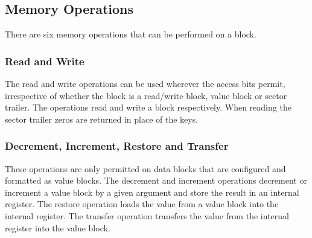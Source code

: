 \documentclass[final,dissertation.tex]{subfiles}
\begin{document}
  \subsection{Memory Operations}

  There are six memory operations that can be performed on a block.

  \subsubsection{Read and Write}
  The read and write operations can be used wherever the access bits permit, irrespective of whether the block is a read/write block, value block or sector trailer. The operations read and write a block respectively. When reading the sector trailer zeros are returned in place of the keys.

  \subsubsection{Decrement, Increment, Restore and Transfer}
  These operations are only permitted on data blocks that are configured and formatted as value blocks. The decrement and increment operations decrement or increment a value block by a given argument and store the result in an internal register. The restore operation loads the value from a value block into the internal register\cite{semiconductors2002mifare}. The transfer operation transfers the value from the internal register into the value block\cite{semiconductors2002mifare}.
\end{document}
